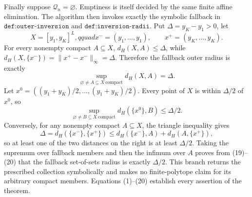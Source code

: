 Finally suppose \(\mathcal Q_n=\varnothing\).  Emptiness is itself decided by the same finite affine elimination.  The algorithm then invokes exactly the symbolic fallback in \(\texttt{def:outer-inversion}\) and \(\texttt{def:inversion-radii}\).  Put \(\Delta=y_K-y_1>0\), let
\[
 X=[y_1,y_K]^L,qquad
 x^-=(y_1,\ldots,y_1),\qquad x^+=(y_K,\ldots,y_K).
\]
For every nonempty compact \(A\subseteq X\), \(d_H(X,A)\leq\Delta\), while
\(d_H(X,\{x^-\})=\|x^+-x^-\|_\infty=\Delta\).  Therefore the fallback outer radius is exactly
\[
 \sup_{\varnothing\neq A\subseteq X\ \mathrm{compact}}d_H(X,A)=\Delta.
 \tag{18}
\]
Let \(x^0=((y_1+y_K)/2,\ldots,(y_1+y_K)/2)\).  Every point of \(X\) is within \(\Delta/2\) of \(x^0\), so
\[
 \sup_{\varnothing\neq B\subseteq X\ \mathrm{compact}}d_H(\{x^0\},B)\leq\Delta/2.
 \tag{19}
\]
Conversely, for any nonempty compact \(A\subseteq X\), the triangle inequality gives
\[
 \Delta=d_H(\{x^-\},\{x^+\})
 \leq d_H(\{x^-\},A)+d_H(A,\{x^+\}),
 \tag{20}
\]
so at least one of the two distances on the right is at least \(\Delta/2\).  Taking the supremum over fallback members and then the infimum over \(A\) proves from (19)--(20) that the fallback set-of-sets radius is exactly \(\Delta/2\).  This branch returns the prescribed collection symbolically and makes no finite-polytope claim for its arbitrary compact members.  Equations (1)--(20) establish every assertion of the theorem.
